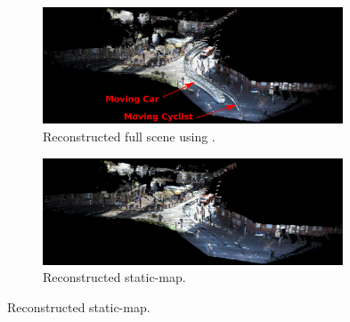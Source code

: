 \documentclass[10pt,twocolumn,letterpaper]{article}  %
\begin{document}
\begin{figure}[t]

  \centering
	\begin{subfigure}{0.5\textwidth}
  	\centering
 	\includegraphics[height=0.12\textheight, width=0.98\textwidth]{image/seqRansac_Marked.eps}
  	\caption{Reconstructed full scene using \cite{c31}.}
  	\label{fig:seqRansac}
	\end{subfigure}%
	\begin{subfigure}{0.5\textwidth}
 	\centering
  	\includegraphics[height=0.12\textheight, width=0.98\textwidth]{image/static_map.eps}%
  	\caption{Reconstructed static-map.}
  	\label{fig:static_map} 
  	\end{subfigure}%
  	
  \centering
    

\end{figure}
\end{document}

